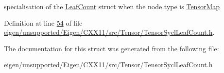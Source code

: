 specialisation of the \hyperlink{struct_eigen_1_1_tensor_sycl_1_1internal_1_1_leaf_count}{Leaf\+Count} struct when the node type is \hyperlink{class_eigen_1_1_tensor_map}{Tensor\+Map} 

Definition at line \hyperlink{eigen_2unsupported_2_eigen_2_c_x_x11_2src_2_tensor_2_tensor_sycl_leaf_count_8h_source_l00054}{54} of file \hyperlink{eigen_2unsupported_2_eigen_2_c_x_x11_2src_2_tensor_2_tensor_sycl_leaf_count_8h_source}{eigen/unsupported/\+Eigen/\+C\+X\+X11/src/\+Tensor/\+Tensor\+Sycl\+Leaf\+Count.\+h}.



The documentation for this struct was generated from the following file\+:\begin{DoxyCompactItemize}
\item 
eigen/unsupported/\+Eigen/\+C\+X\+X11/src/\+Tensor/\+Tensor\+Sycl\+Leaf\+Count.\+h\end{DoxyCompactItemize}
